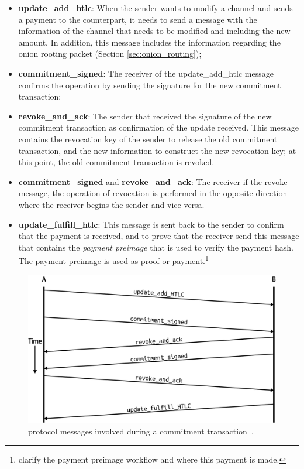 \begin{itemize}
  \item {\bf update\_add\_htlc}: When the sender wants to modify a channel and sends a payment to the counterpart, it needs to send a message with the information of the channel that needs to be modified and including the new amount. In addition, this message includes  the information regarding the onion rooting packet (Section \ref{sec:onion_routing});
  
  \item {\bf commitment\_signed}: The receiver of the update\_add\_htlc message confirms the operation by sending the signature for the new commitment transaction;
  
  \item {\bf revoke\_and\_ack}: The sender that received the signature of the new commitment transaction as confirmation of the update received. This message contains the revocation key of the sender to release the old commitment transaction, and the new information to construct the new revocation key; at this point, the old commitment transaction is revoked.
  
  \item {\bf commitment\_signed} and {\bf revoke\_and\_ack}: The receiver if the revoke message, the operation of revocation is performed in the opposite direction where the receiver begins the sender and vice-versa.
  
  \item {\bf update\_fulfill\_htlc}: This message is sent back to the sender to confirm that the payment is received,
      and to prove that the receiver send this message that contains the \emph{payment preimage} 
        that is used to verify the payment hash. The payment preimage is used as proof or payment.\footnote{clarify the payment preimage workflow and where this payment is made.}
\end{itemize}


\begin{figure}[h]
  \begin{center}
  \includegraphics[width=0.6\columnwidth]{imgs/mtln_0903.png}
  \end{center}
    \caption{{\LN} protocol messages involved during a commitment transaction~\cite{lnbook}.}
  \label{fig:commitment_transaction_ln_messages}
\end{figure}


